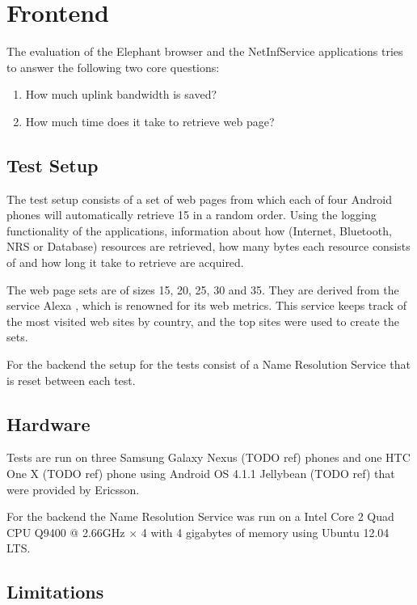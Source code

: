 \section{Frontend}
The evaluation of the Elephant browser and the NetInfService applications tries to answer the following two core questions:

\begin{enumerate}
\item How much uplink bandwidth is saved?
\item How much time does it take to retrieve web page?
\end{enumerate}

\subsection{Test Setup}

The test setup consists of a set of web pages from which each of four Android phones will automatically retrieve 15 in a random order. Using the logging functionality of the applications, information about how (Internet, Bluetooth, NRS or Database) resources are retrieved, how many bytes each resource consists of and how long it take to retrieve are acquired.

The web page sets are of sizes 15, 20, 25, 30 and 35. They are derived from the service Alexa \cite{alexa}, which is renowned for its web metrics. This service keeps track of the most visited web sites by country, and the top sites were used to create the sets.

For the backend the setup for the tests consist of a Name Resolution Service that is reset between each test.

\subsection{Hardware}

Tests are run on three Samsung Galaxy Nexus (TODO ref) phones and one HTC One X (TODO ref) phone using Android OS 4.1.1 Jellybean (TODO ref) that were provided by Ericsson.

For the backend the Name Resolution Service was run on a Intel Core 2 Quad CPU Q9400 @ 2.66GHz × 4 with 4 gigabytes of memory using Ubuntu 12.04 LTS.

\subsection{Limitations}

